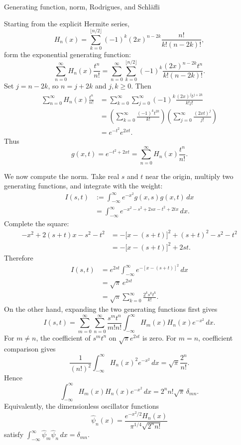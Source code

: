 \documentclass[11pt]{beamer}
\begin{document}
\begin{frame}[allowframebreaks]{Generating function, norm, Rodrigues, and Schl\"afli}
\footnotesize

Starting from the explicit Hermite series,
\[
  H_n(x)=\sum_{k=0}^{\lfloor n/2\rfloor}
  (-1)^k(2x)^{n-2k}\frac{n!}{k!(n-2k)!},
\]
form the exponential generating function:
\[
  \sum_{n=0}^{\infty}H_n(x)\frac{t^n}{n!}
  =\sum_{n=0}^{\infty}\sum_{k=0}^{\lfloor n/2\rfloor}
    (-1)^k\frac{(2x)^{n-2k}t^n}{k!(n-2k)!}.
\]
Set $j=n-2k$, so $n=j+2k$ and $j,k\ge0$. Then
\begin{align*}
  \sum_{n=0}^{\infty}H_n(x)\frac{t^n}{n!}
  &=\sum_{k=0}^{\infty}\sum_{j=0}^{\infty}
    (-1)^k\frac{(2x)^j t^{j+2k}}{k!j!}\\
  &=\left(\sum_{k=0}^{\infty}\frac{(-1)^k t^{2k}}{k!}\right)
    \left(\sum_{j=0}^{\infty}\frac{(2xt)^j}{j!}\right)\\
  &=e^{-t^2}e^{2xt}.
\end{align*}
Thus
\begin{equation}
  g(x,t)=e^{-t^2+2xt}
  =\sum_{n=0}^{\infty}H_n(x)\frac{t^n}{n!}.
  \label{eq:hermite-gen}
\end{equation}

We now compute the norm.  Take real $s$ and $t$ near the origin, multiply two
generating functions, and integrate with the weight:
\begin{align*}
  I(s,t)
  &:=\int_{-\infty}^{\infty}e^{-x^2}g(x,s)g(x,t)\,dx\\
  &=\int_{-\infty}^{\infty}
    e^{-x^2-s^2+2sx-t^2+2tx}\,dx.
\end{align*}
Complete the square:
\begin{align*}
  -x^2+2(s+t)x-s^2-t^2
  &=-\bigl[x-(s+t)\bigr]^2+(s+t)^2-s^2-t^2\\
  &=-\bigl[x-(s+t)\bigr]^2+2st.
\end{align*}
Therefore
\begin{align*}
  I(s,t)
  &=e^{2st}\int_{-\infty}^{\infty}e^{-[x-(s+t)]^2}\,dx\\
  &=\sqrt\pi\,e^{2st}\\
  &=\sqrt\pi\sum_{k=0}^{\infty}\frac{2^k s^k t^k}{k!}.
\end{align*}
On the other hand, expanding the two generating functions first gives
\[
  I(s,t)
  =\sum_{m=0}^{\infty}\sum_{n=0}^{\infty}
    \frac{s^m t^n}{m!n!}
    \int_{-\infty}^{\infty}H_m(x)H_n(x)e^{-x^2}\,dx.
\]
For $m\ne n$, the coefficient of $s^mt^n$ on $\sqrt\pi e^{2st}$ is zero. For $m=n$,
coefficient comparison gives
\[
  \frac{1}{(n!)^2}
  \int_{-\infty}^{\infty}H_n(x)^2e^{-x^2}\,dx
  =\sqrt\pi\frac{2^n}{n!}.
\]
Hence
\begin{equation}
  \int_{-\infty}^{\infty}H_m(x)H_n(x)e^{-x^2}\,dx
  =2^n n!\sqrt\pi\,\delta_{mn}.
  \label{eq:hermite-norm}
\end{equation}
Equivalently, the dimensionless oscillator functions
\[
  \widehat\psi_n(x)
  =\frac{e^{-x^2/2}H_n(x)}{\pi^{1/4}\sqrt{2^n n!}}
\]
satisfy $\int_{-\infty}^{\infty}\widehat\psi_m\widehat\psi_n\,dx=\delta_{mn}$.


\end{frame}
\end{document}
